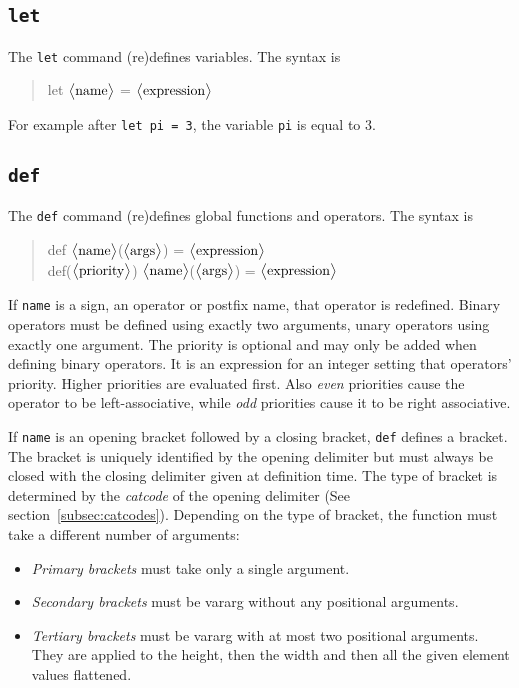 \documentclass[10pt]{article}
\newcommand{\argument}[1]{{${\big<}\text{\textrm{#1}}{\big>}$}}
\newenvironment{code}{\begin{quote}\ttfamily}{\end{quote}}
\begin{document}
    \subsection{\texttt{let}}\label{subsec:cmd-let}
    The \verb|let| command {\small(re)}defines variables.
    The syntax is
    \begin{code}
        let \argument{name} = \argument{expression}
    \end{code}
    For example after \verb|let pi = 3|, the variable \verb|pi| is equal to $ 3 $.
    
    \subsection{\texttt{def}}\label{subsec:cmd-def}
    The \verb|def| command {\small(re)}defines global functions and operators.
    The syntax is
    \begin{code}
        def \argument{name}(\argument{args}) = \argument{expression} \\
        def(\argument{priority}) \argument{name}(\argument{args}) = \argument{expression}
    \end{code}
    If \verb|name| is a sign, an operator or postfix name, that operator is redefined.
    Binary operators must be defined using exactly two arguments, unary operators using exactly one argument.
    The priority is optional and may only be added when defining binary operators.
    It is an expression for an integer setting that operators' priority.
    Higher priorities are evaluated first.
    Also \textsl{even} priorities cause the operator to be left-associative, while \textsl{odd} priorities cause it to be right associative.
    
    If \verb|name| is an opening bracket followed by a closing bracket, \verb|def| defines a bracket.
    The bracket is uniquely identified by the opening delimiter but must always be closed with the closing delimiter given at definition time.
    The type of bracket is determined by the \textsl{catcode} of the opening delimiter (See section~\ref{subsec:catcodes}).
    Depending on the type of bracket, the function must take a different number of arguments:
    \begin{itemize}
        \item \textsl{Primary brackets} must take only a single argument.
        \item \textsl{Secondary brackets} must be vararg without any positional arguments.
        \item \textsl{Tertiary brackets} must be vararg with at most two positional arguments.
              They are applied to the height, then the width and then all the given element values flattened.
    \end{itemize}
    
\end{document}
